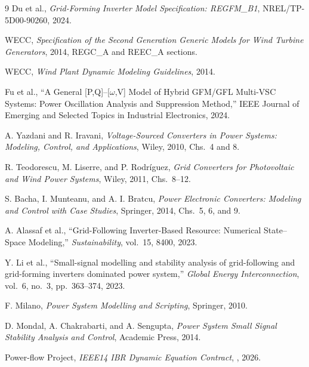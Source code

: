 \documentclass[12pt,a4paper]{article}
\begin{document}
\begin{thebibliography}{9}
Du et al., \emph{Grid-Forming Inverter Model Specification: REGFM\_B1},
NREL/TP-5D00-90260, 2024.

WECC, \emph{Specification of the Second Generation Generic Models for Wind
Turbine Generators}, 2014, REGC\_A and REEC\_A sections.

WECC, \emph{Wind Plant Dynamic Modeling Guidelines}, 2014.

Fu et al., ``A General [P,Q]--[$\omega$,V] Model of Hybrid GFM/GFL Multi-VSC
Systems: Power Oscillation Analysis and Suppression Method,'' IEEE Journal of
Emerging and Selected Topics in Industrial Electronics, 2024.

A. Yazdani and R. Iravani, \emph{Voltage-Sourced Converters in Power Systems:
Modeling, Control, and Applications}, Wiley, 2010, Chs.~4 and 8.

R. Teodorescu, M. Liserre, and P. Rodríguez, \emph{Grid Converters for
Photovoltaic and Wind Power Systems}, Wiley, 2011, Chs.~8--12.

S. Bacha, I. Munteanu, and A. I. Bratcu, \emph{Power Electronic Converters:
Modeling and Control with Case Studies}, Springer, 2014, Chs.~5, 6, and 9.

A. Alassaf et al., ``Grid-Following Inverter-Based Resource: Numerical
State--Space Modeling,'' \emph{Sustainability}, vol.~15, 8400, 2023.

Y. Li et al., ``Small-signal modelling and stability analysis of grid-following
and grid-forming inverters dominated power system,'' \emph{Global Energy
Interconnection}, vol.~6, no.~3, pp.~363--374, 2023.

F. Milano, \emph{Power System Modelling and Scripting}, Springer, 2010.

D. Mondal, A. Chakrabarti, and A. Sengupta, \emph{Power System Small Signal
Stability Analysis and Control}, Academic Press, 2014.

Power-flow Project, \emph{IEEE14 IBR Dynamic Equation Contract},
, 2026.
\end{thebibliography}
\end{document}
